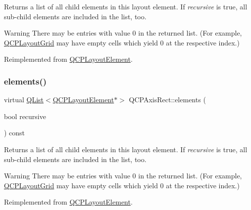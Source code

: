 Returns a list of all child elements in this layout element. If {\itshape recursive} is true, all sub-\/child elements are included in the list, too.

\begin{DoxyWarning}{Warning}
There may be entries with value 0 in the returned list. (For example, \hyperlink{class_q_c_p_layout_grid}{Q\+C\+P\+Layout\+Grid} may have empty cells which yield 0 at the respective index.) 
\end{DoxyWarning}


Reimplemented from \hyperlink{class_q_c_p_layout_element_a76dec8cb31e498994a944d7647a43309}{Q\+C\+P\+Layout\+Element}.

\mbox{\label{class_q_c_p_axis_rect_a516deca38a227006634ecb0456096982}} 
\subsubsection{\texorpdfstring{elements()}{elements()}\hspace{0.1cm}{\footnotesize\ttfamily [2/2]}}
{\footnotesize\ttfamily virtual \hyperlink{class_q_list}{Q\+List}$<$\hyperlink{class_q_c_p_layout_element}{Q\+C\+P\+Layout\+Element}$\ast$$>$ Q\+C\+P\+Axis\+Rect\+::elements (\begin{DoxyParamCaption}\item[{bool}]{recursive }\end{DoxyParamCaption}) const\hspace{0.3cm}{\ttfamily [virtual]}}

Returns a list of all child elements in this layout element. If {\itshape recursive} is true, all sub-\/child elements are included in the list, too.

\begin{DoxyWarning}{Warning}
There may be entries with value 0 in the returned list. (For example, \hyperlink{class_q_c_p_layout_grid}{Q\+C\+P\+Layout\+Grid} may have empty cells which yield 0 at the respective index.) 
\end{DoxyWarning}


Reimplemented from \hyperlink{class_q_c_p_layout_element_a76dec8cb31e498994a944d7647a43309}{Q\+C\+P\+Layout\+Element}.

\mbox{\label{class_q_c_p_axis_rect_a2d9ded3eca97be1fcb5867949391bb88}} 
